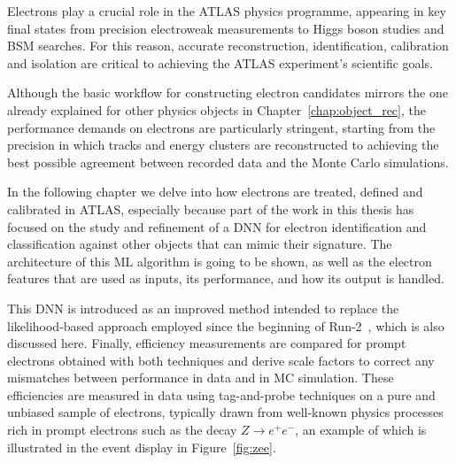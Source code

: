 \newcommand*{\zee}{$Z \to e^{+}e^{-}$\xspace}
\newcommand*{\et}{$E_{\text{T}}$\xspace}
\newcommand*{\zmass}{$\texttt{Z}_{\text{mass}}$\xspace}
\newcommand*{\ziso}{$\texttt{Z}_{\text{iso}}$\xspace}
\newcommand*{\tp}{T$\&$P\xspace}
\newcommand*{\et}{$E_{\text{T}}$\xspace}
\newcommand*{\eta}{$\eta$\xspace}

\setcounter{secnumdepth}{3}

Electrons play a crucial role in the ATLAS physics programme, appearing in key final states from precision electroweak measurements to Higgs boson studies and BSM searches. For this reason, accurate reconstruction, identification, calibration and isolation are critical to achieving the ATLAS experiment’s scientific goals.  

Although the basic workflow for constructing electron candidates mirrors the one already explained for other physics objects in Chapter~\ref{chap:object_rec}, the performance demands on electrons are particularly stringent, starting from the precision in which tracks and energy clusters are reconstructed to achieving the best possible agreement between recorded data and the Monte Carlo simulations.  

In the following chapter we delve into how electrons are treated, defined and calibrated in ATLAS, especially because part of the work in this thesis has focused on the study and refinement of a DNN for electron identification and classification against other objects that can mimic their signature.  The architecture of this ML algorithm is going to be shown, as well as the electron features that are used as inputs, its performance, and how its output is handled. 

This DNN is introduced as an improved method intended to replace the likelihood-based approach employed since the beginning of Run-2~\cite{Aad:2684552,Aaboud:2657964}, which is also discussed here.  Finally, efficiency measurements are compared for prompt electrons obtained with both techniques and derive scale factors to correct any mismatches between performance in data and in MC simulation.  These efficiencies are measured in data using tag-and-probe techniques on a pure and unbiased sample of electrons, typically drawn from well-known physics processes rich in prompt electrons such as the decay $Z\to e^+e^-$, an example of which is illustrated in the event display in Figure~\ref{fig:zee}.

